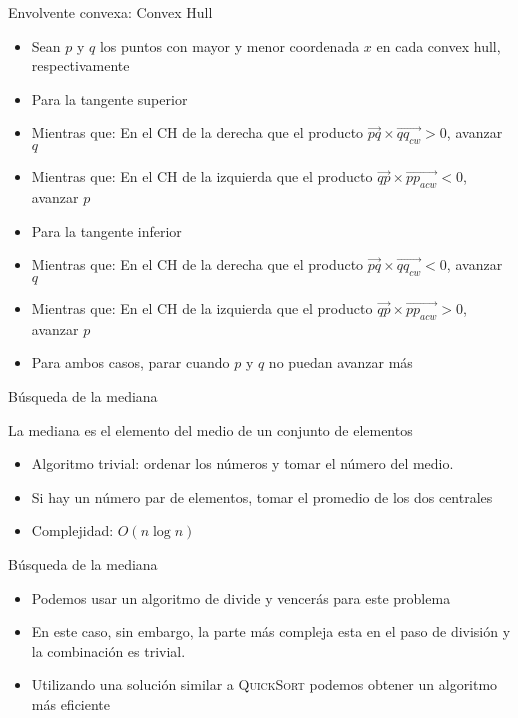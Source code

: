 \documentclass[]{beamer}
\begin{document}
\begin{frame}{Envolvente convexa: Convex Hull}
  \begin{itemize}
    \item Sean $p$ y $q$ los puntos con mayor y menor coordenada $x$ en cada convex hull, respectivamente
      \pause
    \item Para la tangente superior
      \pause
    \item Mientras que: En el CH de la derecha que el producto $\vec{pq} \times \vec{qq_{cw}} > 0$, avanzar $q$
      \pause
    \item Mientras que: En el CH de la izquierda que el producto $\vec{qp} \times \vec{pp_{acw}} < 0$, avanzar $p$
      \pause
    \item Para la tangente inferior
      \pause
    \item Mientras que: En el CH de la derecha que el producto $\vec{pq} \times \vec{qq_{cw}} < 0$, avanzar $q$
      \pause
    \item Mientras que: En el CH de la izquierda que el producto $\vec{qp} \times \vec{pp_{acw}} > 0$, avanzar $p$
      \pause
    \item Para ambos casos, parar cuando $p$ y $q$ no puedan avanzar m\'as
  \end{itemize}
\end{frame}

\begin{frame}{B\'usqueda de la mediana}
  \begin{definition}
    La mediana es el elemento del medio de un conjunto de elementos
  \end{definition}
  \begin{itemize}
    \item Algoritmo trivial: ordenar los n\'umeros y tomar el n\'umero del medio.
      \pause
    \item Si hay un n\'umero par de elementos, tomar el promedio de los dos centrales
      \pause
    \item Complejidad: $O(n \log n)$
  \end{itemize}
\end{frame}

\begin{frame}{B\'usqueda de la mediana}
  \begin{itemize}
    \item Podemos usar un algoritmo de divide y vencer\'as para este problema
      \pause
    \item En este caso, sin embargo, la parte m\'as compleja esta en el paso de divisi\'on y la combinaci\'on es trivial.
      \pause
    \item Utilizando una soluci\'on similar a \textsc{QuickSort} podemos obtener un algoritmo m\'as eficiente
  \end{itemize}
\end{frame}
\end{document}
